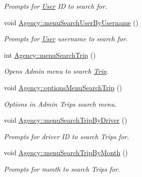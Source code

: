 \begin{DoxyCompactItemize}
\begin{DoxyCompactList}\small\item\em Prompts for \hyperlink{class_user}{User} ID to search for. \end{DoxyCompactList}\item 
\mbox{\label{group___agency_ga4fae1609fafeba4ba99e64a46ffa497b}} 
void \hyperlink{group___agency_ga4fae1609fafeba4ba99e64a46ffa497b}{Agency\+::menu\+Search\+User\+By\+Username} ()
\begin{DoxyCompactList}\small\item\em Prompts for \hyperlink{class_user}{User} username to search for. \end{DoxyCompactList}\item 
\mbox{\label{group___agency_ga486a2028ecfb5d9e07cb2c2082c8f4d1}} 
int \hyperlink{group___agency_ga486a2028ecfb5d9e07cb2c2082c8f4d1}{Agency\+::menu\+Search\+Trip} ()
\begin{DoxyCompactList}\small\item\em Opens Admin menu to search \hyperlink{class_trip}{Trip}. \end{DoxyCompactList}\item 
\mbox{\label{group___agency_ga6ef362edc162c9e2d6d659d2ef6ace96}} 
void \hyperlink{group___agency_ga6ef362edc162c9e2d6d659d2ef6ace96}{Agency\+::options\+Menu\+Search\+Trip} ()
\begin{DoxyCompactList}\small\item\em Options in Admin Trips search menu. \end{DoxyCompactList}\item 
\mbox{\label{group___agency_ga67eab1c222c93d13d3db69a3a3d1ea2f}} 
void \hyperlink{group___agency_ga67eab1c222c93d13d3db69a3a3d1ea2f}{Agency\+::menu\+Search\+Trip\+By\+Driver} ()
\begin{DoxyCompactList}\small\item\em Prompts for driver ID to search Trips for. \end{DoxyCompactList}\item 
\mbox{\label{group___agency_ga2bd31a81607ba5d8f0c6deebf9c05681}} 
void \hyperlink{group___agency_ga2bd31a81607ba5d8f0c6deebf9c05681}{Agency\+::menu\+Search\+Trip\+By\+Month} ()
\begin{DoxyCompactList}\small\item\em Prompts for month to search Trips for. \end{DoxyCompactList}\item 

\end{DoxyCompactItemize}
